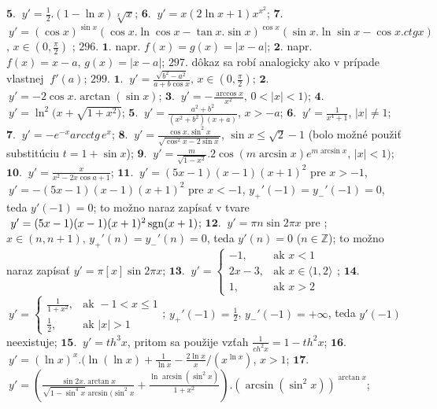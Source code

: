 $\boldsymbol{5.}$ $\ y'=\frac{1}{2}.(1-\ln x) \sqrt[x]{x} $;
$\boldsymbol{6.}$ $\ y'=x(2\ln x+1)x^{x^{2}} $;
$\boldsymbol{7.}$ $\ y'=(\cos x)^{\sin x}(\cos x.\ln\cos x-\tan x.\sin x)^{\cos x}(\sin x.\ln \sin x-\cos x. ctg x)$, $x\in (0,\frac{\pi}{2} ) $ ;
$\boxed{296.}$ 
$\boldsymbol{1.}$ napr. $f(x)= g(x)=\vert x-a\vert $;
$\boldsymbol{2.}$ napr. $f(x)=x-a, \, g(x)=\vert x-a\vert $;
$\boxed{297.}$ dôkaz sa robí analogicky ako v prípade vlastnej $\ f'(a)$;
$\boxed{299.}$ 
$\boldsymbol{1.}$ $\ y'=\frac{\sqrt{b^{2}-a^{2}}}{a+b \cos x},\,x\in (0,\frac{\pi}{2} )  $;
$\boldsymbol{2.}$ $\ y'=-2\cos x.\arctan(\sin x) $;
$\boldsymbol{3.}$ $\ y'=-\frac{\arccos x}{x^{2}},\,0<\vert x\vert<1 )  $;
$\boldsymbol{4.}$ $\ y'=\ln^{2}(x+\sqrt{1+x^{2})}$;
$\boldsymbol{5.}$ $\ y'=\frac{a^{2}+b^{2}}{(x^{2}+b^{2})(x+a)}$, $x > -a$;
$\boldsymbol{6.}$ $\ y'=\frac{1}{x^{4}+1}$, $ \vert x \vert\ne 1$;
$\boldsymbol{7.}$ $\ y'=-e^{-x}arcctg\, e^{x}$;
$\boldsymbol{8.}$ $\ y'=\frac{\cos x.\sin ^{2}x}{\sqrt{\cos ^{2}x-2\sin x}}$, $ \sin x \leq\sqrt{2}- 1$ (bolo možné použiť substitúciu $t=1+\sin x $);
$\boldsymbol{9.}$ $\ y'=\frac{m}{\sqrt{1-x^{2}} }.2\cos (m\arcsin x)e^{m \arcsin x},\,\vert x\vert<1 )$;
$\boldsymbol{10.}$ $\ y'=\frac{x}{x^{2}-2x\cos a+1}$;
$\boldsymbol{11.}$ $\ y'=(5x-1)(x-1)(x+1)^{2}$ pre $x > -1$, $\ y'=-(5x-1)(x-1)(x+1)^{2}$ pre $x < -1$, $y_{+}'(-1)=y_{-}'(-1)=0$, teda $y'(-1)=0$; to možno naraz zapísať v tvare $\ y'=(5x-1)(x-1)(x+1)^{2}\sgn (x+1)$;
$\boldsymbol{12.}$ $\ y'=\pi n \sin 2\pi x$ pre ; $x \in (n,n+1),\, y_{+}'(n)=y_{-}'(n)=0$, teda $y'(n)=0$ ($n\in \mathbb{Z}$); to možno naraz zapísať  $y'=\pi[x] \sin 2\pi x$;
$\boldsymbol{13.}$ $\ y'= \left\{\begin{matrix} -1, & \mbox{ak }x <1 \\ 2x-3, & \mbox{ak }x \in \langle 1,2\rangle \\ 1, & \mbox {ak  }x >2\end{matrix}\right. $;
$\boldsymbol{14.}$ $\ y'= \left\{\begin{matrix} \frac{1}{1+x^{2}}, & \mbox{ak } -1<x\leq 1 \\ \frac{1}{2}, & 
         \mbox{ak   } \vert x \vert > 1\end{matrix}\right.$; $y_{+}'(-1)=\frac{1}{2}$, $y_{-}'(-1)=+\infty$, teda $y'(-1)$ neexistuje;
$\boldsymbol{15.}$ $\ y'=th^{3}x$, pritom sa použije vzťah $\frac{1}{ch^{2}x}=1-th^{2}x$;  
$\boldsymbol{16.}$ $\ y'=(\ln x)^{x}.(\ln(\ln x)+\frac{1}{\ln x}-\frac{2\ln x}{x}/(x^{\ln x})$, $ x >1$;
$\boldsymbol{17.}$ $\ y'=(\frac{\sin 2x . \arctan x}{\sqrt{1-\sin ^{4}x}\arcsin (\sin ^{2}x}+\frac{\ln \arcsin (\sin ^{2}x)}{1+x^{2}}).(\arcsin (\sin ^{2}x))^{\arctan x}$;
